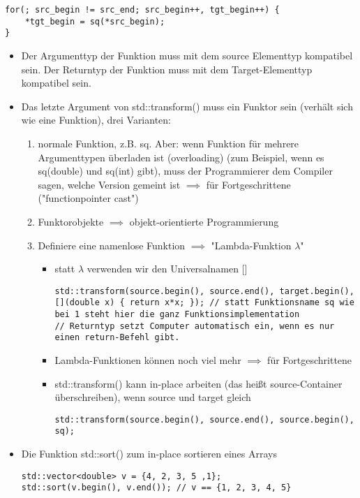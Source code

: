 \documentclass[a4paper]{scrartcl}
\theoremstyle{definition}
\theoremstyle{plain}
\theoremstyle{remark}
\theoremstyle{remark}
\begin{document}
\begin{itemize}
\begin{itemize}
\begin{verbatim}
for(; src_begin != src_end; src_begin++, tgt_begin++) {
	*tgt_begin = sq(*src_begin);
}
\end{verbatim}
\begin{itemize}
\item Der Argumenttyp der Funktion muss mit dem source Elementtyp kompatibel sein. Der Returntyp der Funktion muss mit dem Target-Elementtyp kompatibel sein.
\item Das letzte Argument von std::transform() muss ein Funktor sein (verhält sich wie eine Funktion), drei Varianten:
\begin{enumerate}
\item normale Funktion, z.B. sq. Aber: wenn Funktion für mehrere Argumenttypen überladen ist (overloading) (zum Beispiel, wenn es sq(double) und sq(int) gibt), muss der Programmierer dem Compiler sagen, welche Version gemeint ist $\implies$ für Fortgeschrittene ("functionpointer cast")
\item Funktorobjekte $\implies$ objekt-orientierte Programmierung
\item Definiere eine namenlose Funktion $\implies$ "Lambda-Funktion $\lambda$"
\begin{itemize}
\item statt $\lambda$ verwenden wir den Universalnamen []
\begin{verbatim}
std::transform(source.begin(), source.end(), target.begin(), [](double x) { return x*x; }); // statt Funktionsname sq wie bei 1 steht hier die ganz Funktionsimplementation
// Returntyp setzt Computer automatisch ein, wenn es nur einen return-Befehl gibt.
\end{verbatim}
\item Lambda-Funktionen können noch viel mehr $\implies$ für Fortgeschrittene
\item std::transform() kann in-place arbeiten (das heißt source-Container überschreiben), wenn source und target gleich
\begin{verbatim}
std::transform(source.begin(), source.end(), source.begin(), sq);
\end{verbatim}
\end{itemize}
\end{enumerate}
\item Die Funktion std::sort() zum in-place sortieren eines Arrays
\begin{verbatim}
std::vector<double> v = {4, 2, 3, 5 ,1};
std::sort(v.begin(), v.end()); // v == {1, 2, 3, 4, 5}
\end{verbatim}

\end{itemize}
\end{itemize}
\end{itemize}
\end{document}
